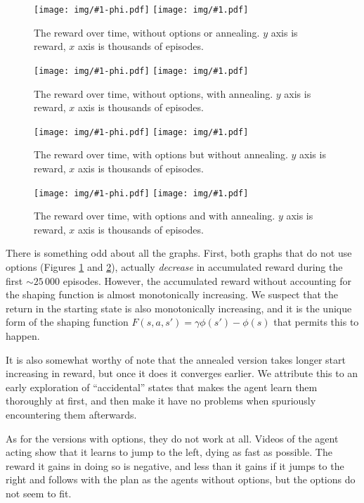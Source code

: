 \newcommand{\drawtraining}[2]{
\begin{figure}[hbtp]
\begin{center}
\texttt{[image: img/\#1-phi.pdf]}
\texttt{[image: img/\#1.pdf]}
\end{center}
\caption{#2\label{fig:#1}}
\end{figure}
}

\drawtraining{q-noopts-noanneal}{The reward over time, without options or
annealing. $y$ axis is reward, $x$ axis is thousands of episodes.}
\drawtraining{q-noopts-anneal}{The reward over time, without options, with
annealing. $y$ axis is reward, $x$ axis is thousands of episodes.}
\drawtraining{q-opts-noanneal}{The reward over time, with options but without
annealing. $y$ axis is reward, $x$ axis is thousands of episodes.}
\drawtraining{q-opts-anneal}{The reward over time, with options and with
annealing. $y$ axis is reward, $x$ axis is thousands of episodes.}

There is something odd about all the graphs. First, both graphs that do not use
options (Figures \ref{fig:q-noopts-noanneal} and \ref{fig:q-noopts-anneal}),
actually \emph{decrease} in accumulated reward during the first $\sim 25\,000$
episodes. However, the accumulated reward without accounting for the shaping
function is almost monotonically increasing. We suspect that the return in the
starting state is also monotonically increasing, and it is the unique form of
the shaping function $F(s, a, s') = \gamma\phi(s') - \phi(s)$ that permits this
to happen.

It is also somewhat worthy of note that the annealed version takes longer start
increasing in reward, but once it does it converges earlier. We attribute this
to an early exploration of ``accidental'' states that makes the agent learn them
thoroughly at first, and then make it have no problems when spuriously
encountering them afterwards.

As for the versions with options, they do not work at all. Videos of
the agent acting show that it learns to jump to the left, dying as fast as
possible. The reward it gains in doing so is negative, and less than it gains if
it jumps to the right and follows with the plan as the agents without options,
but the options do not seem to fit.
  


